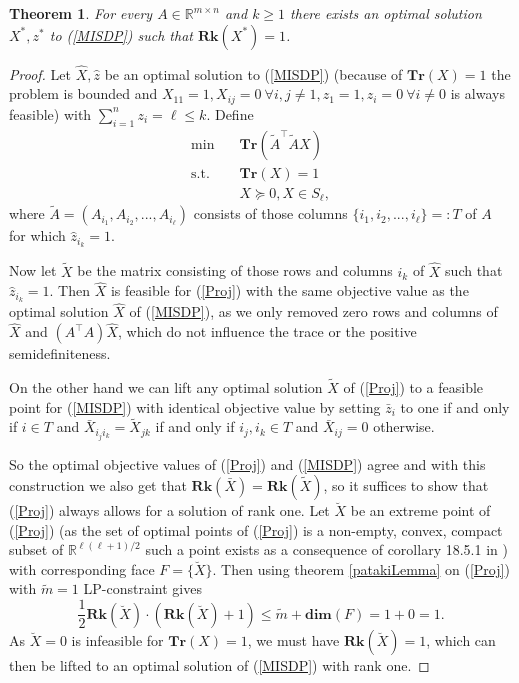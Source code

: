 \documentclass[a4paper,11pt,1p]{elsarticle}
\newtheorem{thm}{Theorem}
\newcommand{\T}{^{\top}}
\newcommand{\R}{\mathds{R}}
\begin{document}
\begin{thm}\label{Rk1thm}
 For every $A \in \R^{m \times n}$ and $k \geq 1$ there exists an optimal solution $X^*, z^*$ to (\ref{MISDP}) such that $\textbf{Rk}(X^*) = 1$. 
\end{thm}
\begin{proof}
 Let $\hat{X}, \hat{z}$ be an optimal solution to (\ref{MISDP}) (because of $\textbf{Tr}(X) = 1$ the problem is bounded and $X_{11} = 1, X_{ij} = 0 \ \forall i,j \neq 1, z_1 = 1, z_i = 0 \ \forall i \neq 0$ is always feasible)
 with $\sum_{i=1}^n z_i = \ell \leq k$. Define
 \begin{align}\label{Proj}
 \text{min} \quad & \textbf{Tr}(\tilde{A}\T\tilde{A}X) \nonumber \\
 \text{s.t.} \quad & \textbf{Tr}(X) = 1 \tag{Proj} \\
 & X \succeq 0 , X \in S_\ell, \nonumber
 \end{align}
where $\tilde{A} = (A_{i_1}, A_{i_2}, ..., A_{i_\ell})$ consists of those
columns $\{{i_1}, {i_2}, ..., {i_\ell}\} =: T$ of $A$ for which
$\hat{z}_{i_k} = 1$.

Now let $\tilde{X}$ be the matrix consisting of those rows and columns 
$i_k$ of $\hat{X}$ such that $\hat{z}_{i_k} = 1$. Then $\hat{X}$ is feasible for (\ref{Proj}) with the same objective value as the optimal solution $\hat{X}$ of (\ref{MISDP}), as we only removed zero rows and columns of $\hat{X}$ 
and $(A\T A)\hat{X}$, which do not influence the trace or the positive
semidefiniteness.

On the other hand we can lift any optimal solution $\tilde{X}$ of (\ref{Proj}) to a feasible point for (\ref{MISDP}) with identical objective value by setting $\bar{z}_i$ to one if and only if $i \in T$
and $\bar{X}_{i_j i_k} = \tilde{X}_{jk}$ if and only if $i_j, i_k \in T$
and $\bar{X}_{ij}=0$ otherwise.

So the optimal objective values of (\ref{Proj}) and (\ref{MISDP}) agree and with this construction we also get that 
$\textbf{Rk}(\bar{X}) = \textbf{Rk}(\tilde{X})$, so it suffices to show that (\ref{Proj}) always allows for a solution of rank one.
Let $\breve{X}$ be an extreme point of (\ref{Proj}) (as the set of optimal points of (\ref{Proj}) is a non-empty, convex, compact subset of $\R^{\ell(\ell+1)/2}$ such a point exists as a consequence of corollary 18.5.1 in
\cite{Roc70}) with corresponding face $F=\{\breve{X}\}$. Then using theorem \ref{patakiLemma} on (\ref{Proj}) with $\tilde{m} = 1$ LP-constraint gives
\begin{equation*}
 \frac{1}{2}\textbf{Rk}(\breve{X})\cdot(\textbf{Rk}(\breve{X})+1) \leq \tilde{m} + \textbf{dim}(F) = 1 + 0 = 1.
\end{equation*}
As $\breve{X}=0$ is infeasible for $\textbf{Tr}(X)=1$, we must have $\textbf{Rk}(\breve{X}) = 1$, which can then be lifted to an optimal solution of (\ref{MISDP}) with rank one.
\end{proof}
\end{document}
